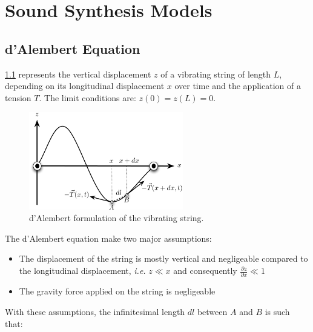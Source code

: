 \chapter{Sound Synthesis Models}
\label{chapter:ssDerivation}


	\section{d'Alembert Equation}
	\label{sec:ssDerivation_dalembert}
	
\myfigname \ref{fig:dalembert} represents the vertical displacement $z$ of a vibrating string of length $L$, depending on its longitudinal displacement $x$ over time and the application of a tension $T$. The limit conditions are: $z(0) = z(L) = 0$.

\begin{figure}[H]
	\begin{center}
		\includegraphics[width=0.6\textwidth]{Appendices/A/Pics/Pdf/DAlembert.pdf}
	\end{center}
	\vspace{-0.5cm}
	\caption[d'Alembert formulation of the vibrating string]{d'Alembert formulation of the vibrating string.}
	\label{fig:dalembert}
\end{figure}

The d'Alembert equation make two major assumptions:

\begin{itemize}
	\item The displacement of the string is mostly vertical and negligeable compared to the longitudinal displacement, \emph{i.e.} $z \ll x$ and consequently $\frac{\partial{z}}{\partial{x}} \ll 1$
	\item The gravity force applied on the string is negligeable
\end{itemize}

With these assumptions, the infinitesimal length $dl$ between $A$ and $B$ is such that:

